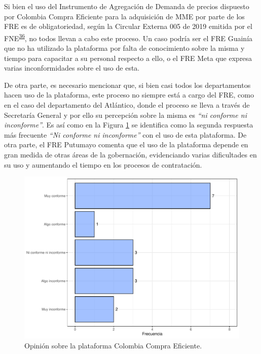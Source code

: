 \documentclass[
]{book}
\begin{document}
Si bien el uso del Instrumento de Agregación de Demanda de precios dispuesto por Colombia Compra Eficiente para la adquisición de MME por parte de los FRE es de obligatoriedad, según la Circular Externa 005 de 2019 emitida por el FNE\textsuperscript{\protect\hyperlink{ref-FNE005-2019}{36}}, no todos llevan a cabo este proceso. Un caso podría ser el FRE Guainía que no ha utilizado la plataforma por falta de conocimiento sobre la misma y tiempo para capacitar a su personal respecto a ello, o el FRE Meta que expresa varias inconformidades sobre el uso de esta.

De otra parte, es necesario mencionar que, si bien casi todos los departamentos hacen uso de la plataforma, este proceso no siempre está a cargo del FRE, como en el caso del departamento del Atlántico, donde el proceso se lleva a través de Secretaría General y por ello su percepción sobre la misma es \emph{``ni conforme ni inconforme''}. Es así como en la Figura \ref{fig:ColombiaCompra} se identifica como la segunda respuesta más frecuente \emph{``Ni conforme ni inconforme''} con el uso de esta plataforma. De otra parte, el FRE Putumayo comenta que el uso de la plataforma depende en gran medida de otras áreas de la gobernación, evidenciando varias dificultades en su uso y aumentando el tiempo en los procesos de contratación.

\begin{figure}[t]

{\centering \includegraphics[width=1\linewidth]{InformeFinal_files/figure-latex/ColombiaCompra-1} 

}

\caption{Opinión sobre la plataforma Colombia Compra Eficiente.}\label{fig:ColombiaCompra}
\end{figure}
\end{document}
